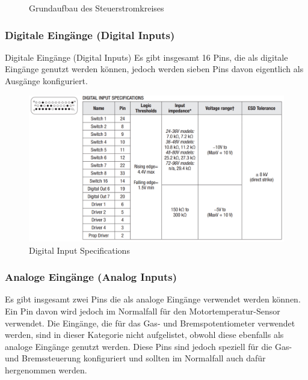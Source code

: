 \begin{figure}[H]
	\begin{center}
		\caption{Grundaufbau des Steuerstromkreises}
	\end{center}
\end{figure}

\newpage



\subsubsection{Digitale Eingänge (Digital Inputs)}
Digitale Eingänge (Digital Inputs)
Es gibt insgesamt 16 Pins, die als digitale Eingänge genutzt werden können, jedoch werden sieben Pins davon eigentlich als Ausgänge konfiguriert. 

\begin{figure}[H]
	\begin{center}
		\includegraphics[scale=0.5]{figures/hcis/Digital_Input_Specifications.png}
		\caption{Digital Input Specifications}
	\end{center}
\end{figure}




\subsubsection{Analoge Eingänge (Analog Inputs)}
Es gibt insgesamt zwei Pins die als analoge Eingänge verwendet werden können. Ein Pin davon wird jedoch im Normalfall für den Motortemperatur-Sensor verwendet. Die Eingänge, die für das Gas- und Bremspotentiometer verwendet werden, sind in dieser Kategorie nicht aufgelistet, obwohl diese ebenfalls als analoge Eingänge genutzt werden. Diese Pins sind jedoch speziell für die Gas- und Bremssteuerung konfiguriert und sollten im Normalfall auch dafür hergenommen werden.

